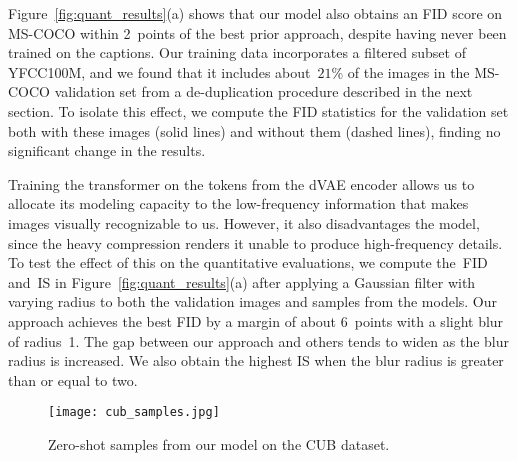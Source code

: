 \documentclass{article}
\begin{document}
Figure~\ref{fig:quant_results}(a) shows that our model also obtains an FID score on MS-COCO within 2~points of the best prior approach, despite having never been trained on the captions. Our training data incorporates a filtered subset of YFCC100M, and we found that it includes about~$21\%$ of the images in the MS-COCO validation set from a de-duplication procedure described in the next section. To isolate this effect, we compute the FID statistics for the validation set both with these images (solid lines) and without them (dashed lines), finding no significant change in the results.

Training the transformer on the tokens from the dVAE encoder allows us to allocate its modeling capacity to the low-frequency information that makes images visually recognizable to us. However, it also disadvantages the model, since the heavy compression renders it unable to produce high-frequency details. To test the effect of this on the quantitative evaluations, we compute the~FID and~IS in Figure~\ref{fig:quant_results}(a) after applying a Gaussian filter with varying radius to both the validation images and samples from the models. Our approach achieves the best FID by a margin of about 6~points with a slight blur of radius~1. The gap between our approach and others tends to widen as the blur radius is increased. We also obtain the highest IS when the blur radius is greater than or equal to two.
\begin{figure}[t]
    \centering
    \texttt{[image: cub\_samples.jpg]}
    \caption{Zero-shot samples from our model on the CUB dataset.}
    \label{fig:cub_samples}
    \vspace{-1em}
\end{figure}
\end{document}
